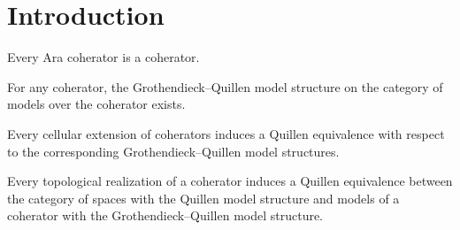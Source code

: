 \section{Introduction} \label{sec: introduction}

Every Ara coherator is a coherator.

For any coherator, the Grothendieck--Quillen model structure on the category of models over the coherator exists.

Every cellular extension of coherators induces a Quillen equivalence with respect to the corresponding Grothendieck--Quillen model structures.

Every topological realization of a coherator induces a Quillen equivalence between the category of spaces with the Quillen model structure and models of a coherator with the Grothendieck--Quillen model structure.